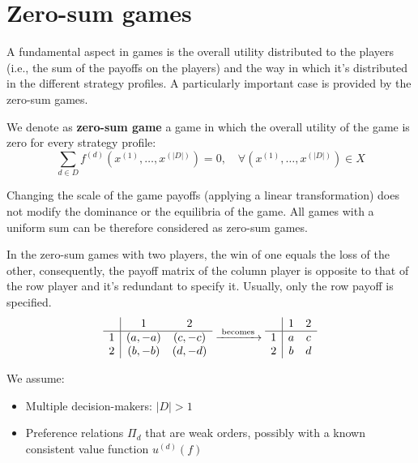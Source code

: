 \chapter{Zero-sum games}
\label{ch:zsg}

A fundamental aspect in games is the overall utility distributed to the players (i.e., the sum of the payoffs on the players) and the way in which it's distributed in the different strategy profiles. A particularly important case is provided by the zero-sum games. \\

\begin{definition}
	We denote as \textbf{zero-sum game} a game in which the overall utility of the game is zero for every strategy profile:
	$$ \sum_{d \in D} f^{(d)} \left(x^{(1)}, \dots, x^{(|D|)}\right) = 0, \quad \forall \left(x^{(1)}, \dots, x^{(|D|)}\right) \in X $$
\end{definition}
Changing the scale of the game payoffs (applying a linear transformation) does not modify the dominance or the equilibria of the game. All games with a uniform sum can be therefore considered as zero-sum games.

In the zero-sum games with two players, the win of one equals the loss of the other, consequently, the payoff matrix of the column player is opposite to that of the row player and it's redundant to specify it. Usually, only the row payoff is specified. 
$$
\begin{array}{c | c c}
	& 1 & 2 \\
	\hline
	1 & (a, -a) & (c,-c) \\
	2 & (b, -b) & (d,-d) \\
\end{array}
\xrightarrow{\text{ becomes }}
\begin{array}{c | c c}
	& 1 & 2 \\
	\hline
	1 & a & c \\
	2 & b & d \\
\end{array}
$$

We assume:
\begin{itemize}
	\item Multiple decision-makers: $|D| > 1$
	
	\item Preference relations $\Pi_d$ that are weak orders, possibly with a known consistent value function $u^{(d)} (f)$
\end{itemize}

